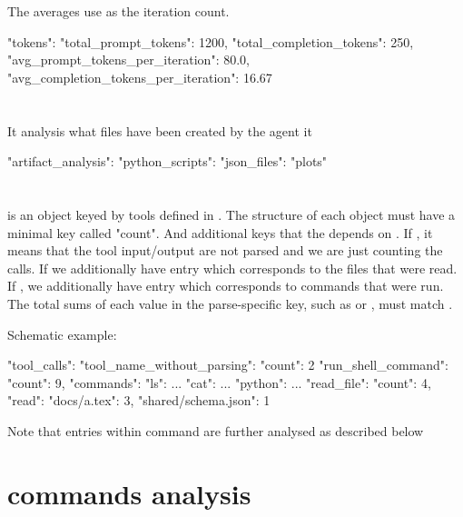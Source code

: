 \documentclass[11pt]{article}
\begin{document}
The averages use  as the iteration count.

\begin{DocCode}
"tokens": {
  "total_prompt_tokens": 1200,
  "total_completion_tokens": 250,
  "avg_prompt_tokens_per_iteration": 80.0,
  "avg_completion_tokens_per_iteration": 16.67
}
\end{DocCode}

\section*{}
It analysis what files have been created by the agent it
\begin{DocCode}
"artifact_analysis":
{
  "python_scripts":
  "json_files":
  "plots"
}
\end{DocCode}

\section*{}
 is an object keyed by tools defined in . 
The structure of each object must have a minimal key called "count". 
And additional keys that the depends on . 
If , it means that the tool input/output are not parsed and we are just counting the calls.
If  we additionally have  entry which corresponds to the files that were read.
If , we additionally have  entry which corresponds to commands that were run.
The total sums of each value in the parse-specific key, such as  or , must match .

Schematic example:
\begin{DocCode}
"tool_calls": {
  "tool_name_without_parsing": {"count": 2}
  "run_shell_command": {
    "count": 9,
    "commands": {
      "ls": {...}
      "cat": {...}
      "python": {...}
    }
  }
  "read_file": {
    "count": 4,
    "read": {
    "docs/a.tex": 3,
    "shared/schema.json": 1
    }
  }
}
\end{DocCode}
Note that entries within command are further analysed as described below


\section*{commands analysis}
\end{document}
